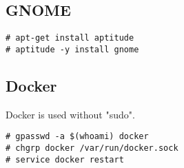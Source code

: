 \subsection{GNOME}

\noindent
\begin{Sbox}
\begin{minipage}[t]{0.975\linewidth}
\begin{verbatim}
# apt-get install aptitude
# aptitude -y install gnome 
\end{verbatim}
\end{minipage}
\end{Sbox}
\fbox{\TheSbox}


\subsection{Docker}

Docker is used without "sudo".

\noindent
\begin{Sbox}
\begin{minipage}[t]{0.975\linewidth}
\begin{verbatim}
# gpasswd -a $(whoami) docker
# chgrp docker /var/run/docker.sock
# service docker restart
\end{verbatim}
\end{minipage}
\end{Sbox}
\fbox{\TheSbox}

